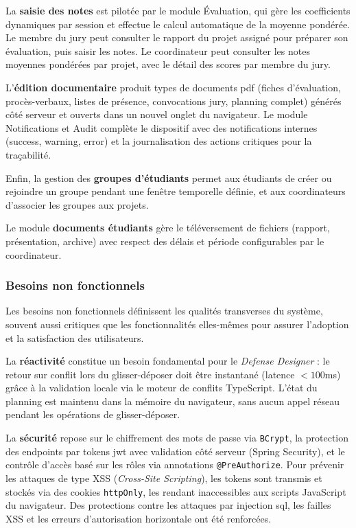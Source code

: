 La \textbf{saisie des notes} est pilotée par le module Évaluation, qui gère les coefficients dynamiques par session et effectue le calcul automatique de la moyenne pondérée. Le membre du jury peut consulter le rapport du projet assigné pour préparer son évaluation, puis saisir les notes. Le coordinateur peut consulter les notes moyennes pondérées par projet, avec le détail des scores par membre du jury.

L'\textbf{édition documentaire} produit  types de documents \gls{pdf} (fiches d'évaluation, procès-verbaux, listes de présence, convocations jury, planning complet) générés côté serveur et ouverts dans un nouvel onglet du navigateur. Le module Notifications et Audit complète le dispositif avec des notifications internes (success, warning, error) et la journalisation des actions critiques pour la traçabilité.

Enfin, la gestion des \textbf{groupes d'étudiants} permet aux étudiants de créer ou rejoindre un groupe pendant une fenêtre temporelle définie, et aux coordinateurs d'associer les groupes aux projets.

Le module \textbf{documents étudiants} gère le téléversement de fichiers (rapport, présentation, archive) avec respect des délais et période configurables par le coordinateur.

\subsubsection{Besoins non fonctionnels}
\label{ch3:besoins_non_fonctionnels}

Les besoins non fonctionnels définissent les qualités transverses du système, souvent aussi critiques que les fonctionnalités elles-mêmes pour assurer l'adoption et la satisfaction des utilisateurs.

La \textbf{réactivité} constitue un besoin fondamental pour le \textit{Defense Designer} : le retour sur conflit lors du glisser-déposer doit être instantané (latence $< 100$ms) grâce à la validation locale via le moteur de conflits TypeScript. L'état du planning est maintenu dans la mémoire du navigateur, sans aucun appel réseau pendant les opérations de glisser-déposer.

La \textbf{sécurité} repose sur le chiffrement des mots de passe via \texttt{BCrypt}, la protection des endpoints par tokens \acrshort{jwt} avec validation côté serveur (Spring Security), et le contrôle d'accès basé sur les rôles via annotations \texttt{@PreAuthorize}. Pour prévenir les attaques de type XSS (\textit{Cross-Site Scripting}), les tokens sont transmis et stockés via des cookies \texttt{httpOnly}, les rendant inaccessibles aux scripts JavaScript du navigateur. Des protections contre les attaques par injection \acrshort{sql}, les failles XSS et les erreurs d'autorisation horizontale ont été renforcées.

